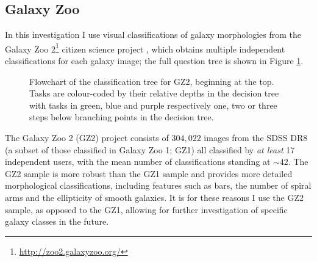 \subsection{Galaxy Zoo}\label{sec:GZ}

In this investigation I use visual classifications of galaxy morphologies from the Galaxy Zoo 2\footnote{\url{http://zoo2.galaxyzoo.org/}} citizen science project \citep{GZ2}, which obtains multiple independent classifications for each galaxy image; the full question tree is shown in Figure \ref{tree}.  

\begin{figure}
\caption[GZ2 classification decision tree]{Flowchart of the classification tree for GZ2, beginning at the top. Tasks are colour-coded by their relative depths in the decision tree with tasks in green, blue and purple respectively one, two or three steps below branching points in the decision tree.}
\label{tree}
\end{figure}

The Galaxy Zoo 2 (GZ2) project consists of $304, 022$ images from the SDSS DR8 (a subset of those classified in Galaxy Zoo 1; GZ1) all classified by \emph{at least} 17 independent users, with the mean number of classifications standing at $\sim42$. The GZ2 sample is more robust than the GZ1 sample and provides more detailed morphological classifications, including features such as bars, the number of spiral arms and the ellipticity of smooth galaxies. It is for these reasons I use the GZ2 sample, as opposed to the GZ1, allowing for further investigation of specific galaxy classes in the future. 

